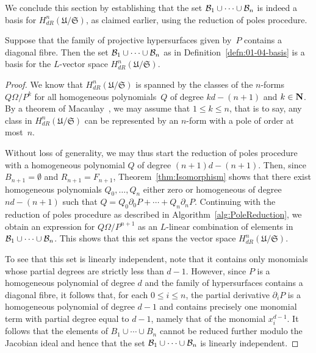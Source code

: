 We conclude this section by establishing that the set 
$\mathcal{B}_1 \cup \dotsb \cup \mathcal{B}_n$ is indeed a basis for 
$H_{dR}^n(\mathfrak{U}/\mathfrak{S})$, as claimed earlier, 
using the reduction of poles procedure.

\begin{thm} \label{thm:Basis}
Suppose that the family of projective hypersurfaces given by~$P$ contains 
a diagonal fibre.  Then the set $\mathcal{B}_1 \cup \dotsb \cup \mathcal{B}_n$ as in 
Definition~\ref{defn:01-04-basis} is a basis for the $L$-vector space 
$H_{dR}^n(\mathfrak{U}/\mathfrak{S})$.
\end{thm}

\begin{proof}
We know that $H_{dR}^n(\mathfrak{U}/\mathfrak{S})$ is spanned 
by the classes of the $n$-forms $Q \Omega / P^k$ for all 
homogeneous polynomials~$Q$ of degree $kd-(n+1)$ and $k \in \mathbf{N}$.  
By a theorem of Macaulay~\citep[\S 4, (4.11)]{Griffiths1969}, 
we may assume that $1 \leq k \leq n$, that is to say, any class in 
$H_{dR}^n(\mathfrak{U}/\mathfrak{S})$ can be represented by an 
$n$-form with a pole of order at most~$n$.

Without loss of generality, we may thus start the reduction of poles 
procedure with a homogeneous polynomial $Q$ of degree $(n+1)d-(n+1)$.  Then, 
since $B_{n+1} = \emptyset$ and $R_{n+1} = F_{n+1}$, 
Theorem~\ref{thm:Isomorphism} shows that there exist homogeneous polynomials 
$Q_0, \dotsc, Q_n$ either zero or homogeneous of degree $nd-(n+1)$ such that 
$Q = Q_0 \partial_0 P + \dotsb + Q_n \partial_n P$.  Continuing with the 
reduction of poles procedure as described in 
Algorithm~\ref{alg:PoleReduction}, we obtain an expression for 
$Q \Omega / P^{n+1}$ as an $L$-linear combination of elements in 
$\mathcal{B}_1 \cup \dotsb \cup \mathcal{B}_n$.  This shows that this set spans the vector 
space $H_{dR}^n(\mathfrak{U}/\mathfrak{S})$.

To see that this set is linearly independent, note that it contains only 
monomials whose partial degrees are strictly less than $d-1$.  However, since 
$P$ is a homogeneous polynomial of degree $d$ and the family of hypersurfaces 
contains a diagonal fibre, it follows that, for each $0 \leq i \leq n$, the 
partial derivative $\partial_i P$ is a homogeneous polynomial of degree $d-1$ 
and contains precisely one monomial term with partial degree equal to $d-1$, 
namely that of the monomial $x_i^{d-1}$.  It follows that the elements of 
$B_1 \cup \dotsb \cup B_n$ cannot be reduced further modulo the Jacobian 
ideal and hence that the set $\mathcal{B}_1 \cup \dotsb \cup \mathcal{B}_n$ is linearly 
independent.
\end{proof}

